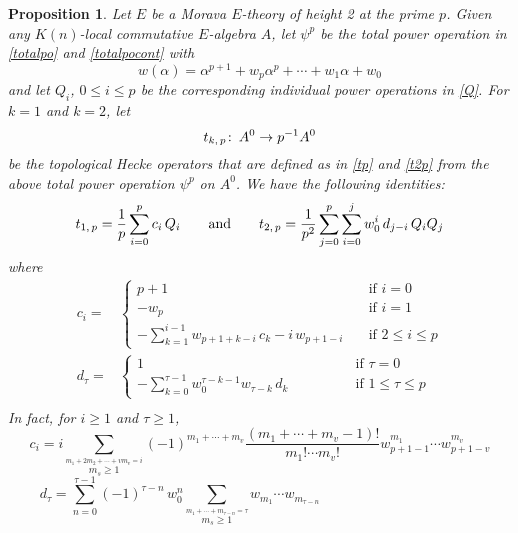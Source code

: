 \documentclass{gtpart}
\newtheorem{prop}[thm]{Proposition}
\theoremstyle{definition}
\theoremstyle{remark}
\def\co{\colon\thinspace}
\newcommand{\ad}{{\rm and}}
\newcommand{\A}{\alpha}
\newcommand{\T}{\tau}
\renewcommand{\=}{\approx}
\renewcommand{\-}{\sim}
\numberwithin{equation}{section}
\numberwithin{thm}{section}
\begin{document}
\begin{prop}
 \label{prop:Q}
 Let $E$ be a Morava $E$-theory of height 2 at the prime $p$.  
 Given any $K(n)$-local commutative $E$-algebra $A$, 
 let $\psi^p$ be the total power operation in \eqref{totalpo} and \eqref{totalpocont} with 
 \begin{equation}
  \label{wi}
  w(\A) = \A^{p + 1} + w_p \A^p + \cdots + w_1 \A + w_0 
 \end{equation}
 and let $Q_i$, $0 \leq i \leq p$ 
 be the corresponding individual power operations in \eqref{Q}.  
 For $k = 1$ and $k = 2$, let 
 \[
  t_{k,\,p} \co A^0 \to p^{-1} A^0 
 \]
 be the topological Hecke operators 
 that are defined as in \eqref{tp} and \eqref{t2p} 
 from the above total power operation $\psi^p$ on $A^0$.  
 We have the following identities: 
 \[
  t_{1,\,p} = \frac{1}{p} \sum_{i = 0}^p c_i \, Q_i \qquad \ad \qquad t_{2,\,p} = \frac{1}{p^2} \sum_{j = 0}^p \sum_{i = 0}^j w_0^i \, d_{j - i} \, Q_i Q_j 
 \]
 where 
 \begin{equation*}
  \begin{split}
   c_i = & \left\{\!\!\!
   \begin{array}{ll}
    p + 1 & \quad \text{if $i = 0$} \\
    -w_p & \quad \text{if $i = 1$} \\
    -\sum_{k = 1}^{i - 1} w_{p + 1 + k - i} \, c_k - i \, w_{p + 1 - i} & \quad \text{if $2 \leq i \leq p$} 
   \end{array}
   \right.\\
   d_\T = & \left\{\!\!
   \begin{array}{ll}
    1 & \qquad\qquad \text{if $\T = 0$} \\
    -\sum_{k = 0}^{\T - 1} w_0^{\T - k - 1} w_{\T - k} \, d_k & \qquad\qquad \text{if $1 \leq \T \leq p$} 
   \end{array}
   \right.\\
  \end{split}
 \end{equation*}
 In fact, for $i \geq 1$ and $\T \geq 1$, 
 \begin{equation}
  \label{c_i}
  c_i = i \sum_{\stackrel{\scriptstyle m_1 + 2 m_2 + \cdots + v m_v = i}{m_s \geq 1}} (-1)^{m_1 + \cdots + m_v} 
  \frac{(m_1 + \cdots + m_v - 1)!}{m_1! \cdots m_v!} w_{p + 1 - 1}^{m_1} \cdots w_{p + 1 - v}^{m_v} 
 \end{equation}
 \begin{equation}
  \label{d_t}
  d_\T = \sum_{n = 0}^{\T - 1} (-1)^{\T - n} \, w_0^n \sum_{\stackrel{\scriptstyle m_1 + \cdots + m_{\T - n} = \T}{m_s \geq 1}} w_{m_1} \cdots w_{m_{\T - n}} 
  \qquad\qquad\qquad\qquad\qquad\quad~~
 \end{equation}
\end{prop}
\end{document}
